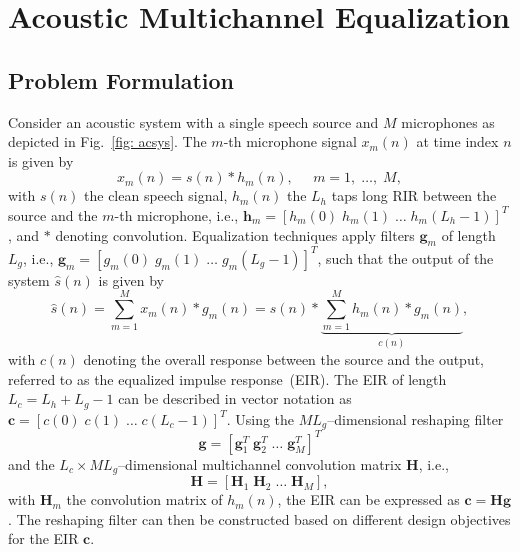 \documentclass[10pt]{IEEEtran}
\begin{document}

\section{Acoustic Multichannel Equalization}
\subsection{Problem Formulation}
Consider an acoustic system with a single speech source and $M$ microphones as depicted in Fig.~\ref{fig: acsys}.
The $m$-th microphone signal $x_m(n)$ at time index $n$ is given by 
\begin{equation}
x_m(n) = s(n) \ast h_m(n), \; \; \; \; \; m = 1, \; \ldots, \; M,
\end{equation}
with $s(n)$ the clean speech signal, $h_m(n)$ the $L_h$ taps long RIR between the source and the $m$-th microphone, i.e., $\mathbf{h}_m = \left[h_m(0) \; h_m(1) \; \ldots \; h_m(L_h-1) \right]^T$, and $\ast$ denoting convolution.
Equalization techniques apply filters $\mathbf{g}_m$ of length $L_g$, i.e., $\mathbf{g}_m = \left[g_m(0) \; g_m(1) \; \ldots \; g_m(L_g-1) \right]^T$, such that the output of the system $\hat{s}(n)$ is given by
\begin{equation}
  \hat{s}(n) = \sum_{m=1}^{M} x_m(n) \ast g_m(n) = s(n) \ast \underbrace{\sum_{m=1}^{M} h_m(n) \ast g_m(n)}_{c(n)},
\end{equation}
with $c(n)$ denoting the overall response between the source and the output, referred to as the equalized impulse response~(EIR).
The EIR of length $L_c = L_h+L_g-1$ can be described in vector notation as $\mathbf{c} = \left[c(0) \; c(1) \; \ldots \; c(L_c-1) \right]^{T}$.
Using the $ML_g$--dimensional reshaping filter 
\begin{equation}
\mathbf{g}  =  \left[\mathbf{g}_1^T \; \mathbf{g}_2^T \; \ldots \; \mathbf{g}_M^T \right]^T
\end{equation}
and the $L_c \times ML_g$--dimensional multichannel convolution matrix $\mathbf{H}$, i.e.,
\begin{equation}
\mathbf{H} = \left[\mathbf{H}_1 \; \mathbf{H}_2 \; \ldots \; \mathbf{H}_M \right],
\end{equation}
with $\mathbf{H}_m$ the convolution matrix of $h_m(n)$, the EIR can be expressed as $\mathbf{c} = \mathbf{H}\mathbf{g}$.
The reshaping filter can then be constructed based on different design objectives for the EIR $\mathbf{c}$.
\end{document}
